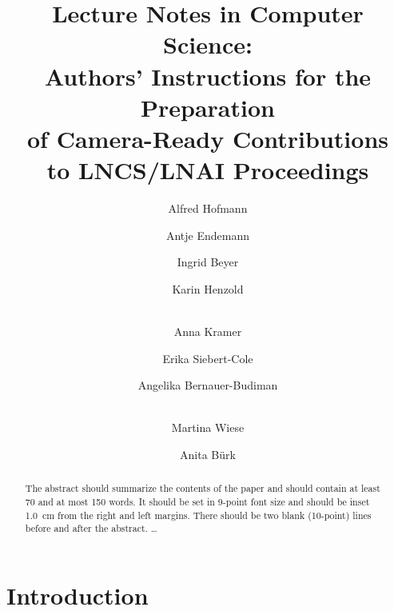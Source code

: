 \documentclass[a4paper]{llncs}
\begin{document}
\pagestyle{empty}

\mainmatter

\title{Lecture Notes in Computer Science:\\Authors' Instructions
for the Preparation\\of Camera-Ready
Contributions\\to LNCS/LNAI Proceedings}


\author{Alfred Hofmann \and Antje Endemann
\and Ingrid Beyer \and Karin Henzold \and\\
Anna Kramer \and Erika Siebert-Cole
\and Angelika Bernauer-Budiman \and\\
Martina Wiese \and Anita B\"urk}



\maketitle

\begin{abstract}
The abstract should summarize the contents of the paper and should
contain at least 70 and at most 150 words. It should be set in 9-point
font size and should be inset 1.0~cm from the right and left margins.
There should be two blank (10-point) lines before and after the
abstract.
\dots
\end{abstract}


\section{Introduction}
\end{document}
